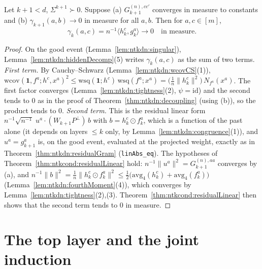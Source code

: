 \begin{theorem}\label{thm:ntkdn:gradIndepStep}
  \leanok
Let $k+1<d$, $\Sigma^{k+1}\succ0$. Suppose (a) $G_{k+1}^{(n),cc'}$ converges in measure to constants and (b) $\gamma_{k+1}(a,b)\to0$ in measure for all $a,b$. Then for $a,c\in[m]$,
\[
  \gamma_k(a,c)=n^{-1}\bigl\langle h_k^c,g_k^a\bigr\rangle\longrightarrow0\quad\text{in measure}.
\]
\end{theorem}

\begin{proof}
  \leanok
On the good event (Lemma~\ref{lem:ntkdn:singular}), Lemma~\ref{lem:ntkdn:hiddenDecomp}(5) writes $\gamma_k(a,c)$ as the sum of two terms.
\emph{First term.} By Cauchy--Schwarz (Lemma~\ref{lem:ntkdn:wcovCS}(1)), $\mathrm{wcov}(\mathbf 1,f^a;h^c,x^a)^2\le\mathrm{wsq}(\mathbf 1;h^c)\,\mathrm{wsq}(f^a;x^a)=\bigl(\tfrac1n\|h_k^c\|^2\bigr)\,N_{f^a}(x^a)$. The first factor converges (Lemma~\ref{lem:ntkdn:tightness}(2), $\psi=\mathrm{id}$) and the second tends to $0$ as in the proof of Theorem~\ref{thm:ntkdn:decoupling} (using (b)), so the product tends to $0$.
\emph{Second term.} This is the residual linear form $n^{-1}\sqrt{n^{-1}}\;u^a\cdot(W_{k+1}P^\perp)\,b$ with $b=h_k^c\odot f_k^a$, which is a function of the past alone (it depends on layers $\le k$ only, by Lemma~\ref{lem:ntkdn:congruence}(1)), and $u^a=g_{k+1}^a$ is, on the good event, evaluated at the projected weight, exactly as in Theorem~\ref{thm:ntkdn:residualGram} (\texttt{linAbs\_eq}). The hypotheses of Theorem~\ref{thm:ntkcond:residualLinear} hold: $n^{-1}\|u^a\|^2=G_{k+1}^{(n),aa}$ converges by (a), and $n^{-1}\|b\|^2=\tfrac1n\|h_k^c\odot f_k^a\|^2\le\tfrac12\bigl(\mathrm{avg}_4(h_k^c)+\mathrm{avg}_4(f_k^a)\bigr)$ (Lemma~\ref{lem:ntkdn:fourthMoment}(4)), which converges by Lemma~\ref{lem:ntkdn:tightness}(2),(3). Theorem~\ref{thm:ntkcond:residualLinear} then shows that the second term tends to $0$ in measure.
\end{proof}


\section{The top layer and the joint induction}\label{sec:ntkdn:induction}

